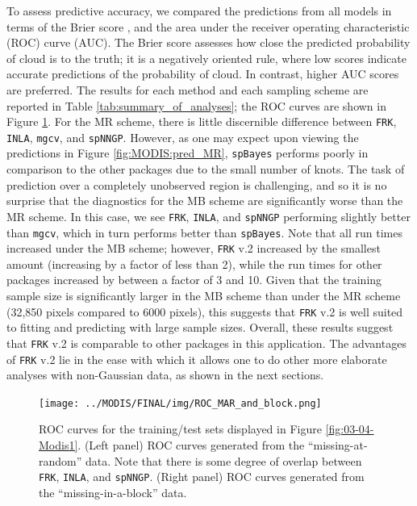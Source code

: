 \documentclass[12pt,a4paper]{article}
\begin{document}
To assess predictive accuracy, we compared the predictions from all models in terms of the Brier score \citep[Sec.~3]{Gneiting_2007_scoring_rules}, and the area under the receiver operating characteristic (ROC) curve (AUC). %
The Brier score assesses how close the predicted probability of cloud is to the truth; it is a negatively oriented rule, where low scores indicate accurate predictions of the probability of cloud.
In contrast, higher AUC scores are preferred.
The results for each method and each sampling scheme are reported in Table \ref{tab:summary_of_analyses}; the ROC curves are shown in Figure \ref{fig:MODIS:ROC}. 
For the MR scheme, there is little discernible difference between \texttt{FRK}, \texttt{INLA}, \texttt{mgcv}, and \texttt{spNNGP}. 
 However, as one may expect upon viewing the predictions in Figure \ref{fig:MODIS:pred_MR}, \texttt{spBayes} performs poorly in comparison to the other packages due to the small number of knots. 
 The task of prediction over a completely unobserved region is challenging, and so it is no surprise that the diagnostics for the MB scheme are significantly worse than the MR scheme. 
 In this case, we see \texttt{FRK}, \texttt{INLA}, and \texttt{spNNGP} performing slightly better than \texttt{mgcv}, which in turn performs better than \texttt{spBayes}. 
 Note that all run times increased under the MB scheme; however, \texttt{FRK} v.2 increased by the smallest amount (increasing by a factor of less than 2), while the run times for other packages increased by between a factor of 3 and 10. 
 Given that the training sample size is significantly larger in the MB scheme than under the MR scheme (32,850 pixels compared to 6000 pixels), this suggests that \texttt{FRK} v.2 is well suited to fitting and predicting with large sample sizes.  
 Overall, these results suggest that \texttt{FRK} v.2 is comparable to other packages in this application. 
 The advantages of \texttt{FRK} v.2 lie in the ease with which it allows one to do other more elaborate analyses with non-Gaussian data, as shown in the next sections. 
 
 

\begin{figure}[t!]
    \centering
    \texttt{[image: ../MODIS/FINAL/img/ROC\_MAR\_and\_block.png]}
    \caption{ROC curves for the training/test sets displayed in Figure \ref{fig:03-04-Modis1}. (Left panel) ROC curves generated from the ``missing-at-random'' data. Note that there is some degree of overlap between \texttt{FRK}, \texttt{INLA}, and \texttt{spNNGP}. (Right panel) ROC curves generated from the ``missing-in-a-block'' data. } 
  \label{fig:MODIS:ROC}
\end{figure}
\end{document}
